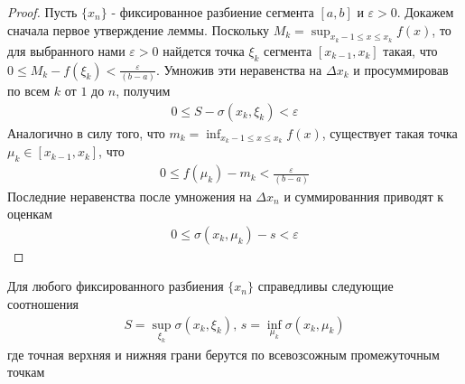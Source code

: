 \documentclass[10pt]{article}
\begin{document}
    \begin{proof}
        Пусть $\{x_n\}$ - фиксированное разбиение сегмента $[a, b]$ и $\varepsilon > 0$. Докажем сначала первое утверждение леммы. Поскольку $M_k = \sup_{x_k-1 \leq x \leq x_k} f(x)$, то для выбранного нами $\varepsilon>0$ найдется точка $\xi_k$ сегмента $[x_{k-1}, x_k]$ такая, что $0 \leq M_k - f(\xi_k) < \frac{\varepsilon}{(b-a)}$. Умножив эти неравенства на $\Delta x_k$ и просуммировав по всем $k$ от $1$ до $n$, получим
        \begin{gather*}
            0 \leq S - \sigma(x_k, \xi_k) < \varepsilon
        \end{gather*}
        Аналогично в силу того, что $m_k = \inf_{x_k-1 \leq x \leq x_k} f(x)$, существует такая точка $\mu_k \in [x_{k-1}, x_k]$, что
        \begin{gather*}
            0 \leq f(\mu_k) - m_k < \frac{\varepsilon}{(b-a)}
        \end{gather*}
        Последние неравенства после умножения на $\Delta x_n$ и суммированния приводят к оценкам
        \begin{gather*}
            0 \leq \sigma(x_k, \mu_k) - s < \varepsilon
        \end{gather*}
    \end{proof}
    \begin{corollary}
        Для любого фиксированного разбиения $\{x_n\}$ справедливы следующие соотношения
        \begin{gather*}
            S = \sup_{\xi_k} \sigma(x_k, \xi_k),\, s = \inf_{\mu_k} \sigma(x_k, \mu_k)
        \end{gather*}
        где точная верхняя и нижняя грани берутся по всевозсожным промежуточным точкам
    \end{corollary}
\end{document}
